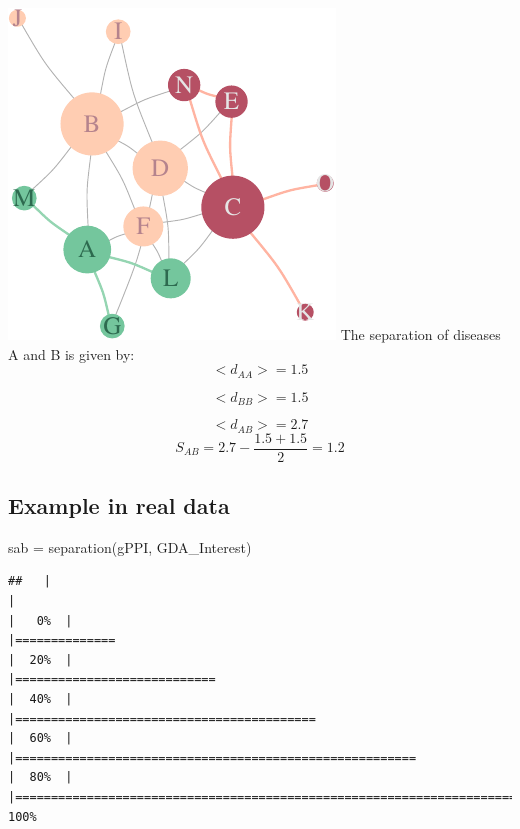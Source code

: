 \documentclass[
]{book}
\newenvironment{Shaded}{\begin{snugshade}}{\end{snugshade}}
\newcommand{\FunctionTok}[1]{\textcolor[rgb]{0.00,0.00,0.00}{#1}}
\newcommand{\NormalTok}[1]{#1}
\newcommand{\OtherTok}[1]{\textcolor[rgb]{0.56,0.35,0.01}{#1}}
\begin{document}
\includegraphics{NetMed_files/figure-latex/separation-1.pdf}
The separation of diseases A and B is given by:
\[
<d_{AA}> = 1.5
\]

\[
<d_{BB}> = 1.5
\]

\[
<d_{AB}> = 2.7
\]
\[
S_{AB} = 2.7 - \frac{1.5+ 1.5}2 = 1.2
\]

\hypertarget{example-in-real-data-1}{%
\subsection{Example in real data}\label{example-in-real-data-1}}

\begin{Shaded}
\begin{Highlighting}[]
\NormalTok{sab }\OtherTok{=} \FunctionTok{separation}\NormalTok{(gPPI, GDA\_Interest)}
\end{Highlighting}
\end{Shaded}

\begin{verbatim}
##   |                                                                              |                                                                      |   0%  |                                                                              |==============                                                        |  20%  |                                                                              |============================                                          |  40%  |                                                                              |==========================================                            |  60%  |                                                                              |========================================================              |  80%  |                                                                              |======================================================================| 100%
\end{verbatim}
\end{document}
